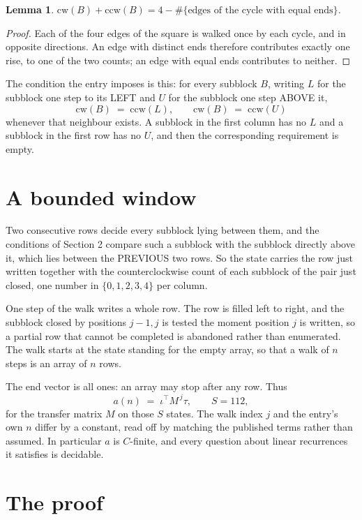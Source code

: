 \documentclass[11pt,a4paper]{article}
\theoremstyle{plain}
\newtheorem{lemma}[theorem]{Lemma}
\theoremstyle{definition}
\begin{document}
\begin{lemma}\label{lem:sum}
$\mathrm{cw}(B)+\mathrm{ccw}(B)=4-\#\{\text{edges of the cycle with equal ends}\}$.
\end{lemma}

\begin{proof}
Each of the four edges of the square is walked once by each cycle, and in opposite directions.
An edge with distinct ends therefore contributes exactly one rise, to one of the two counts;
an edge with equal ends contributes to neither.
\end{proof}

The condition the entry imposes is this: for every subblock $B$, writing $L$ for the subblock one step to its LEFT and $U$ for the subblock one step ABOVE it,
\[
\mathrm{cw}(B)\;=\;\mathrm{ccw}(L),\qquad \mathrm{cw}(B)\;=\;\mathrm{ccw}(U)
\]
whenever that neighbour exists. A subblock in the first column has no $L$ and a subblock in the first row has no $U$, and then the corresponding requirement is empty.

\section{A bounded window}

Two consecutive rows decide every subblock lying between them, and the conditions of Section 2 compare such a subblock with the subblock directly above it, which lies between the PREVIOUS two rows. So the state carries the row just written together with the counterclockwise count of each subblock of the pair just closed, one number in $\{0,1,2,3,4\}$ per column.

One step of the walk writes a whole row. The row is filled left to right, and the subblock
closed by positions $j-1,j$ is tested the moment position $j$ is written, so a partial row that
cannot be completed is abandoned rather than enumerated. The walk starts at the state standing
for the empty array, so that a walk of $n$ steps is an array of $n$ rows.

The end vector is all ones: an array may stop after any row. Thus
\[
a(n)\;=\;\iota^{\!\top}M^{\,j}\tau ,\qquad S=112,
\]
for the transfer matrix $M$ on those $S$ states. The walk index $j$ and the entry's own $n$
differ by a constant, read off by matching the published terms rather than assumed. In
particular $a$ is $C$-finite, and every question about linear recurrences it satisfies is
decidable.

\section{The proof}
\end{document}

